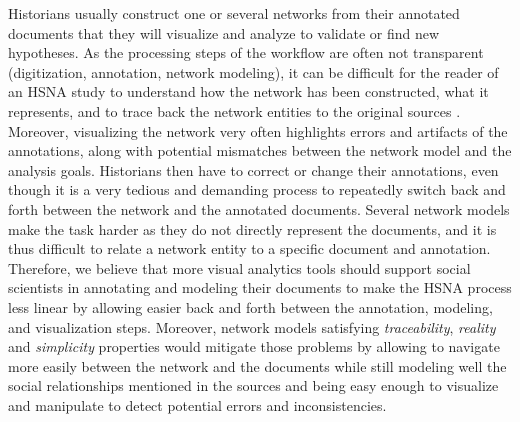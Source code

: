 

Historians usually construct one or several networks from their annotated documents that they will visualize and analyze to validate or find new hypotheses.
As the processing steps of the workflow are often not transparent (digitization, annotation, network modeling), it can be difficult for the reader of an HSNA study to understand how the network has been constructed, what it represents, and to trace back the network entities to the original sources \cite{dufournaudCommentRendreVisible2018}.
Moreover, visualizing the network very often highlights errors and artifacts of the annotations, along with potential mismatches between the network model and the analysis goals.
Historians then have to correct or change their annotations, even though it is a very tedious and demanding process  to repeatedly switch back and forth between the network and the annotated documents.
Several network models make the task harder as they do not directly represent the documents, and it is thus difficult to relate a network entity to a specific document and annotation.
Therefore, we believe that more visual analytics tools should support social scientists in annotating and modeling their documents to make the HSNA process less linear by allowing easier back and forth between the annotation, modeling, and visualization steps.
Moreover, network models satisfying  \emph{traceability}, \emph{reality} and \emph{simplicity} properties would mitigate those problems by allowing to navigate more easily between the network and the documents while still modeling well the social relationships mentioned in the sources and being easy enough to visualize and manipulate to detect potential errors and inconsistencies.

